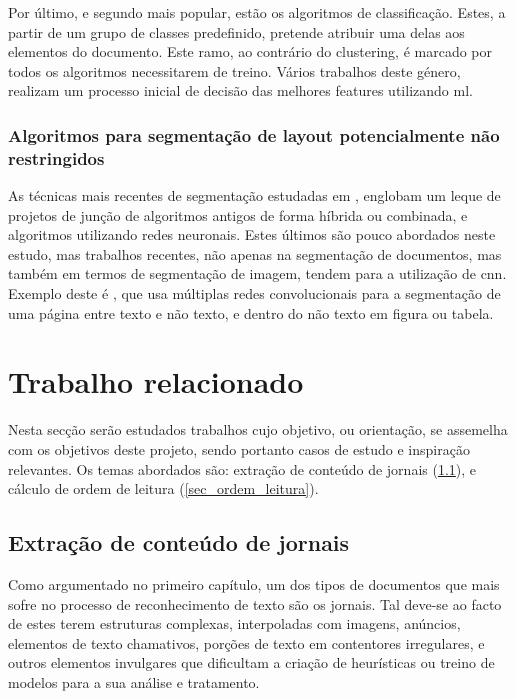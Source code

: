 Por último, e segundo mais popular, estão os algoritmos de classificação. Estes, a partir de um grupo de classes predefinido, pretende atribuir uma delas aos elementos do documento. Este ramo, ao contrário do clustering, é marcado por todos os algoritmos necessitarem de treino. Vários trabalhos deste género, realizam um processo inicial de decisão das melhores features utilizando \acrshort{ml}.

\subsubsection{Algoritmos para segmentação de layout potencialmente não restringidos}

As técnicas mais recentes de segmentação estudadas em \cite{ESKENAZI20171}, englobam um leque de projetos de junção de algoritmos antigos de forma híbrida ou combinada, e algoritmos utilizando redes neuronais. Estes últimos são pouco abordados neste estudo, mas trabalhos recentes, não apenas na segmentação de documentos, mas também em termos de segmentação de imagem, tendem para a utilização de \acrshort{cnn}. Exemplo deste é \cite{8269981}, que usa múltiplas redes convolucionais para a segmentação de uma página entre texto e não texto, e dentro do não texto em figura ou tabela.




\section{Trabalho relacionado}
\label{sec_trab_relacionado}

Nesta secção serão estudados trabalhos cujo objetivo, ou orientação, se assemelha com os objetivos deste projeto, sendo portanto casos de estudo e inspiração relevantes. Os temas abordados são: extração de conteúdo de jornais (\ref{sec_ext_cont_jornais}), e cálculo de ordem de leitura (\ref{sec_ordem_leitura}).

\subsection{Extração de conteúdo de jornais}
\label{sec_ext_cont_jornais}

Como argumentado no primeiro capítulo, um dos tipos de documentos que mais sofre no processo de reconhecimento de texto são os jornais. Tal deve-se ao facto de estes terem estruturas complexas, interpoladas com imagens, anúncios, elementos de texto chamativos, porções de texto em contentores irregulares, e outros elementos invulgares que dificultam a criação de heurísticas ou treino de modelos para a sua análise e tratamento.

